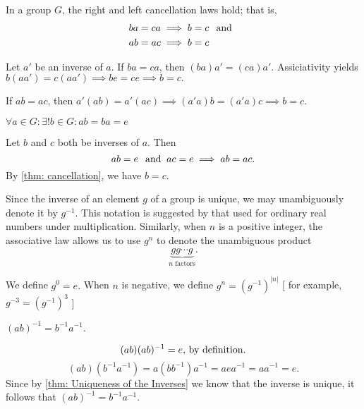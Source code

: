 \begin{thm}[Cancellation]
  \label{thm: cancellation}
  In a group $G$, the right and left cancellation laws hold; that is,
  \begin{equation}
    \begin{aligned}
      ba &= ca \implies b=c \;\;\, \text{and}\;\; \\
      ab &= ac \implies b=c
    \end{aligned}
  \end{equation}
\end{thm}
\begin{prf}
  Let $a'$ be an inverse of $a$. If $ba=ca$, then $(ba)a' = (ca)a'$. Assiciativity yields $b(aa')=c(aa') \implies be = ce \implies b = c. $

  If $ab = ac$, then $a'(ab)=a'(ac) \implies (a'a)b=(a'a)c \implies b=c.$
\end{prf}

\begin{thm}
  \label{thm: Uniqueness of the Inverses}
  $\forall a \in G: \exists ! b\in G: ab = ba = e$
\end{thm}
\begin{prf}
  Let $b$ and $c$ both be inverses of $a$. Then
  \begin{equation}
    ab = e \;\;\, \text{and}\;\; ac = e \implies ab = ac.
  \end{equation}
  By \ref{thm: cancellation}, we have $b=c$.
\end{prf}

\begin{mydef}[notation: $g^{-1}$]
  Since the inverse of an element $g$ of a group is unique, we may unambiguously denote it by $g^{-1}$. This notation is suggested by that used for ordinary real numbers under multiplication. Similarly, when $n$ is a positive integer, the associative law allows us to use $g^n$ to denote the unambiguous product
  \begin{equation}
    \underbrace{gg\cdots g}_{\text{$n$ factors}}.
  \end{equation}

  We define $g^0=e.$ When $n$ is negative, we define $g^n=(g^{-1})^{|n|}$ [ for example, $g^{-3} = (g^{-1})^3$ ]
\end{mydef}

\begin{thm} 
  $(ab)^{-1}=b^{-1}a^{-1}.$
\end{thm}
\begin{prf}
  \begin{equation}
    (ab)(ab)^{-1}=e, $ by definition.$
  \end{equation}
  \begin{equation}
    (ab)(b^{-1}a^{-1}) = a(bb^{-1})a^{-1} = aea^{-1} = aa^{-1} = e.
  \end{equation}
  Since by \ref{thm: Uniqueness of the Inverses} we know that the inverse is unique, it follows that $(ab)^{-1} = b^{-1}a^{-1}$.
\end{prf}

